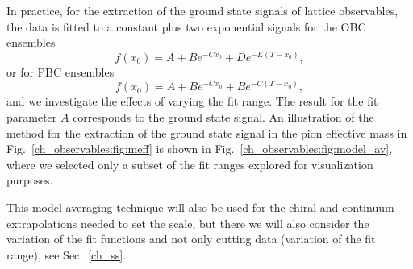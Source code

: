 In practice, for the extraction of the ground state signals of lattice observables, the data is fitted to a constant plus two exponential signals for the OBC ensembles
\begin{equation}
\label{ch_observables:eq:fit}
f(x_0)=A+Be^{-Cx_0}+De^{-E(T-x_0)},
\end{equation}
or for PBC ensembles
\begin{equation}
f(x_0)=A+Be^{-Cx_0}+Be^{-C(T-x_0)},
\end{equation}
and we investigate the effects of varying the fit range. The result for the fit parameter $A$ corresponds to the ground state signal. An illustration of the method for the extraction of the ground state signal in the pion effective mass in Fig.~\ref{ch_observables:fig:meff} is shown in Fig.~\ref{ch_observables:fig:model_av}, where we selected only a subset of the fit ranges explored for visualization purposes.

This model averaging technique will also be used for the chiral and continuum extrapolations needed to set the scale, but there we will also consider the variation of the fit functions and not only cutting data (variation of the fit range), see Sec.~\ref{ch_ss}.

